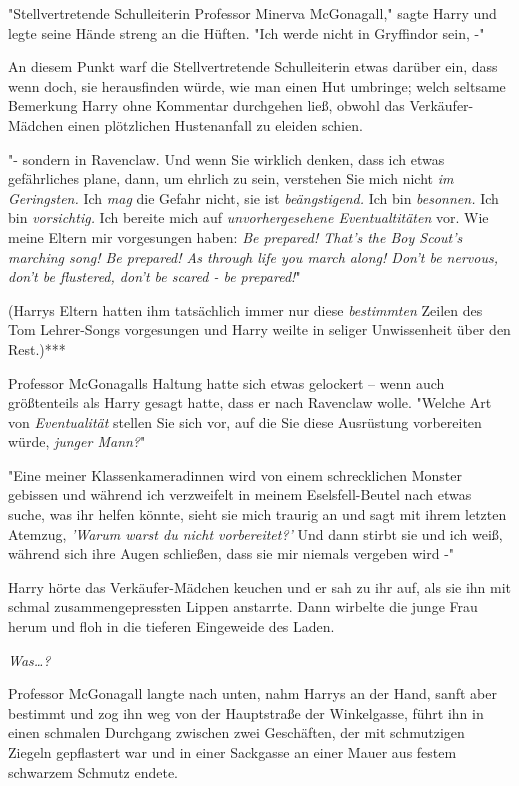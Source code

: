 {"Stellvertretende Schulleiterin Professor Minerva McGonagall," sagte Harry und legte seine Hände streng an die Hüften. "Ich werde nicht in Gryffindor sein, -"

An diesem Punkt warf die Stellvertretende Schulleiterin etwas darüber ein, dass wenn doch, sie herausfinden würde, wie man einen Hut umbringe; welch seltsame Bemerkung Harry ohne Kommentar durchgehen ließ, obwohl das Verkäufer-Mädchen einen plötzlichen Hustenanfall zu eleiden schien.

"- sondern in Ravenclaw. Und wenn Sie wirklich denken, dass ich etwas gefährliches plane, dann, um ehrlich zu sein, verstehen Sie mich nicht \emph{im Geringsten.} Ich \emph{mag} die Gefahr nicht, sie ist \emph{beängstigend.} Ich bin \emph{besonnen.} Ich bin \emph{vorsichtig.} Ich bereite mich auf \emph{unvorhergesehene Eventualtitäten} vor. Wie meine Eltern mir vorgesungen haben: \emph{Be prepared! That's the Boy Scout's marching song! Be prepared! As through life you march along! Don't be nervous, don't be flustered, don't be scared - be prepared!}"

(Harrys Eltern hatten ihm tatsächlich immer nur diese \emph{bestimmten} Zeilen des Tom Lehrer-Songs vorgesungen und Harry weilte in seliger Unwissenheit über den Rest.)***

Professor McGonagalls Haltung hatte sich etwas gelockert -- wenn auch größtenteils als Harry gesagt hatte, dass er nach Ravenclaw wolle. "Welche Art von \emph{Eventualität} stellen Sie sich vor, auf die Sie diese Ausrüstung vorbereiten würde, \emph{junger Mann?}"

"Eine meiner Klassenkameradinnen wird von einem schrecklichen Monster gebissen und während ich verzweifelt in meinem Eselsfell-Beutel nach etwas suche, was ihr helfen könnte, sieht sie mich traurig an und sagt mit ihrem letzten Atemzug, \emph{'Warum warst du nicht vorbereitet?'} Und dann stirbt sie und ich weiß, während sich ihre Augen schließen, dass sie mir niemals vergeben wird -"

Harry hörte das Verkäufer-Mädchen keuchen und er sah zu ihr auf, als sie ihn mit schmal zusammengepressten Lippen anstarrte. Dann wirbelte die junge Frau herum und floh in die tieferen Eingeweide des Laden.

\emph{Was…?}

Professor McGonagall langte nach unten, nahm Harrys an der Hand, sanft aber bestimmt und zog ihn weg von der Hauptstraße der Winkelgasse, führt ihn in einen schmalen Durchgang zwischen zwei Geschäften, der mit schmutzigen Ziegeln gepflastert war und in einer Sackgasse an einer Mauer aus festem schwarzem Schmutz endete.

}
